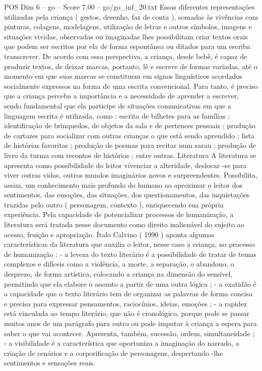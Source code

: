 \begin{textsample}{POS Dim 6 – go – Score 7.00 – go/go\_inf\_20.txt}
Essas diferentes representações utilizadas pela criança ( gestos, desenho, faz de conta ), somadas às vivências com pinturas, colagens, modelagens, utilização de letras e outros símbolos, imagens e situações vividas, observadas ou imaginadas lhes possibilitam criar textos orais que podem ser escritos por ela de forma espontânea ou ditados para um escriba transcrever.
De acordo com essa perspectiva, a criança, desde bebê, é capaz de produzir textos, de deixar marcas, portanto, lê e escreve de formas variadas, até o momento em que suas marcas se constituem em signos linguísticos acordados socialmente expressos na forma de uma escrita convencional.
Para tanto, é preciso que a criança perceba a importância e a necessidade de aprender a escrever, sendo fundamental que ela participe de situações comunicativas em que a linguagem escrita é utilizada, como : escrita de bilhetes para as famílias ; identificação de brinquedos, de objetos da sala e de pertences pessoais ; produção de cartazes para socializar com outras crianças o que está sendo aprendido ; lista de histórias favoritas ; produção de poemas para recitar num sarau ; produção de livro da turma com recontos de histórias ; entre outras.
Literatura A literatura se apresenta como possibilidade do leitor vivenciar a alteridade, deslocar -se para viver outras vidas, outros mundos imaginários novos e surpreendentes.
Possibilita, assim, um conhecimento mais profundo do humano ao aproximar o leitor dos sentimentos, das emoções, das situações, dos questionamentos, das inquietações trazidas pelo outro ( personagem, contexto ), enriquecendo sua própria experiência.
Pela capacidade de potencializar processos de humanização, a literatura será tratada nesse documento como direito inalienável do sujeito ao acesso, fruição e apropriação.
Ítalo Calvino ( 1990 ) aponta algumas características da literatura que auxilia o leitor, nesse caso a criança, no processo de humanização : - a leveza do texto literário é a possibilidade de tratar de temas complexos e difíceis como a violência, a morte, a separação, o abandono, o desprezo, de forma artística, colocando a criança na dimensão do sensível, permitindo que ela elabore o assunto a partir de uma outra lógica ; - a exatidão é a capacidade que o texto literário tem de organizar as palavras de forma concisa e precisa para expressar pensamentos, raciocínios, ideias, emoções ; - a rapidez está vinculada ao tempo literário, que não é cronológico, porque pode se passar muitos anos de um parágrafo para outro ou pode imputar à criança a espera para saber o que vai acontecer.
Apresenta, também, sucessão, ordem, simultaneidade ; - a visibilidade é a característica que oportuniza a imaginação do narrado, a criação de cenários e a corporificação de personagens, despertando -lhe sentimentos e sensações reais.

\end{textsample}
